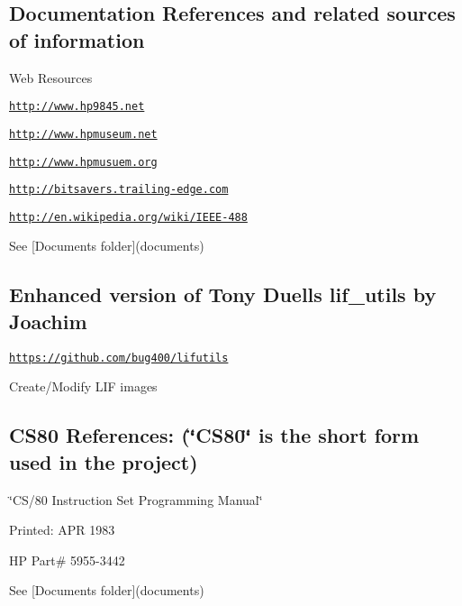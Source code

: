  \subsection*{Documentation References and related sources of information}


\begin{DoxyItemize}
\item Web Resources
\begin{DoxyItemize}
\item \href{http://www.hp9845.net}{\tt http\+://www.\+hp9845.\+net}
\item \href{http://www.hpmuseum.net}{\tt http\+://www.\+hpmuseum.\+net}
\item \href{http://www.hpmusuem.org}{\tt http\+://www.\+hpmusuem.\+org}
\item \href{http://bitsavers.trailing-edge.com}{\tt http\+://bitsavers.\+trailing-\/edge.\+com}
\item \href{http://en.wikipedia.org/wiki/IEEE-488}{\tt http\+://en.\+wikipedia.\+org/wiki/\+I\+E\+E\+E-\/488}
\item See \mbox{[}Documents folder\mbox{]}(documents)
\end{DoxyItemize}
\end{DoxyItemize}



 \subsection*{Enhanced version of Tony Duell\textquotesingle{}s lif\+\_\+utils by Joachim}


\begin{DoxyItemize}
\item \href{https://github.com/bug400/lifutils}{\tt https\+://github.\+com/bug400/lifutils}
\item Create/\+Modify L\+IF images
\end{DoxyItemize}



 \subsection*{C\+S80 References\+: (\char`\"{}\+C\+S80\char`\"{} is the short form used in the project)}


\begin{DoxyItemize}
\item \char`\"{}\+C\+S/80 Instruction Set Programming Manual\char`\"{}
\item Printed\+: A\+PR 1983
\item HP Part\# 5955-\/3442
\item See \mbox{[}Documents folder\mbox{]}(documents)
\end{DoxyItemize}



